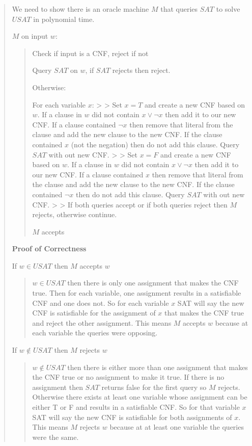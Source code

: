 \documentclass[
  letterpaper,
  DIV=11,
  numbers=noendperiod]{scrartcl}
\begin{document}
\begin{quote}
We need to show there is an oracle machine \(M\) that queries \(SAT\) to
solve \(USAT\) in polynomial time.

\(M\) on input \(w\):

\begin{quote}
Check if input is a CNF, reject if not

Query \(SAT\) on \(w\), if \(SAT\) rejects then reject.

Otherwise:

For each variable \(x\): \textgreater{} \textgreater{} Set \(x=T\) and
create a new CNF based on \(w\). If a clause in \(w\) did not contain
\(x\lor \lnot x\) then add it to our new CNF. If a clause contained
\(\lnot x\) then remove that literal from the clause and add the new
clause to the new CNF. If the clause contained \(x\) (not the negation)
then do not add this clause. Query \(SAT\) with out new CNF.
\textgreater{} \textgreater{} Set \(x=F\) and create a new CNF based on
\(w\). If a clause in \(w\) did not contain \(x\lor \lnot x\) then add
it to our new CNF. If a clause contained \(x\) then remove that literal
from the clause and add the new clause to the new CNF. If the clause
contained \(\lnot x\) then do not add this clause. Query \(SAT\) with
out new CNF. \textgreater{} \textgreater{} If both queries accept or if
both queries reject then \(M\) rejects, otherwise continue.

\(M\) accepts
\end{quote}

\textbf{Proof of Correctness}

If \(w\in USAT\) then \(M\) accepts \(w\)

\begin{quote}
\(w\in USAT\) then there is only one assignment that makes the CNF true.
Then for each variable, one assignment results in a satisfiable CNF and
one does not. So for each variable \(x\) SAT will say the new CNF is
satisfiable for the assignment of \(x\) that makes the CNF true and
reject the other assignment. This means \(M\) accepts \(w\) because at
each variable the queries were opposing.
\end{quote}

If \(w\notin USAT\) then \(M\) rejects \(w\)

\begin{quote}
\(w\notin USAT\) then there is either more than one assignment that
makes the CNF true or no assignment to make it true. If there is no
assignment then \(SAT\) returns false for the first query so \(M\)
rejects. Otherwise there exists at least one variable whose assignment
can be either T or F and results in a satisfiable CNF. So for that
variable \(x\) SAT will say the new CNF is satisfiable for both
assignments of \(x\). This means \(M\) rejects \(w\) because at at least
one variable the queries were the same.
\end{quote}
\end{quote}
\end{document}
